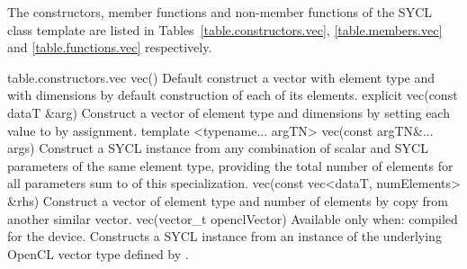 The constructors, member functions and non-member functions of the SYCL  class template are listed in Tables~\ref{table.constructors.vec}, \ref{table.members.vec} and \ref{table.functions.vec} respectively.



{table.constructors.vec}
  \addRow
    {vec()}
    {
      Default construct a vector with element type  and
      with  dimensions by default construction of
      each of its elements.
    }
  \addRow
    {explicit vec(const dataT \&arg)}
    {
      Construct a vector of element type  and
       dimensions by setting each value to  by
      assignment.
    }
  \addRowTwoL
    {template <typename... argTN>}
    {vec(const argTN\&... args)}
    {
      Construct a SYCL  instance from any combination of scalar and SYCL  parameters of the same element type, providing the total number of elements for all parameters sum to  of this  specialization.
    }    
  \addRow
    {vec(const vec<dataT, numElements> \&rhs)}
    {
      Construct a vector of element type  and number of elements  by copy from another similar vector.
    }
  \addRow
    {vec(vector_t openclVector)}
    {
      Available only when: compiled for the device.
      \newline
      Constructs a SYCL  instance from an instance of the underlying OpenCL vector type defined by .
    }
\completeTable

